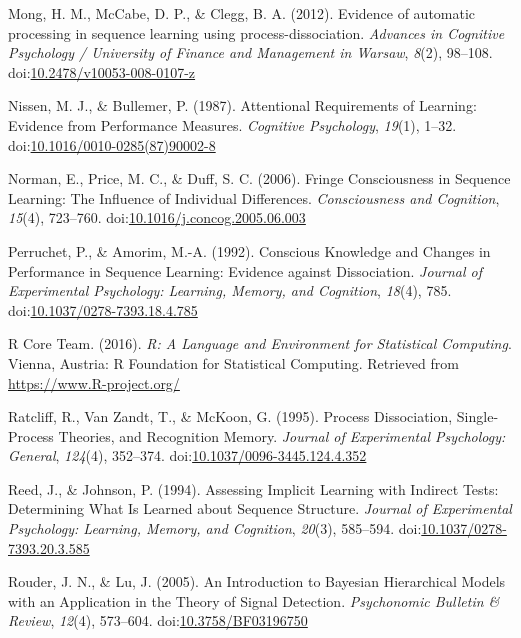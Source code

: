 \documentclass[floatsintext,man]{apa6}
\begin{document}
\hypertarget{ref-mongux5fevidenceux5f2012}{}
Mong, H. M., McCabe, D. P., \& Clegg, B. A. (2012). Evidence of
automatic processing in sequence learning using process-dissociation.
\emph{Advances in Cognitive Psychology / University of Finance and
Management in Warsaw}, \emph{8}(2), 98--108.
doi:\href{https://doi.org/10.2478/v10053-008-0107-z}{10.2478/v10053-008-0107-z}

\hypertarget{ref-nissenux5fattentionalux5f1987}{}
Nissen, M. J., \& Bullemer, P. (1987). Attentional Requirements of
Learning: Evidence from Performance Measures. \emph{Cognitive
Psychology}, \emph{19}(1), 1--32.
doi:\href{https://doi.org/10.1016/0010-0285(87)90002-8}{10.1016/0010-0285(87)90002-8}

\hypertarget{ref-normanux5ffringeux5f2006}{}
Norman, E., Price, M. C., \& Duff, S. C. (2006). Fringe Consciousness in
Sequence Learning: The Influence of Individual Differences.
\emph{Consciousness and Cognition}, \emph{15}(4), 723--760.
doi:\href{https://doi.org/10.1016/j.concog.2005.06.003}{10.1016/j.concog.2005.06.003}

\hypertarget{ref-perruchetux5fconsciousux5f1992}{}
Perruchet, P., \& Amorim, M.-A. (1992). Conscious Knowledge and Changes
in Performance in Sequence Learning: Evidence against Dissociation.
\emph{Journal of Experimental Psychology: Learning, Memory, and
Cognition}, \emph{18}(4), 785.
doi:\href{https://doi.org/10.1037/0278-7393.18.4.785}{10.1037/0278-7393.18.4.785}

\hypertarget{ref-R-base}{}
R Core Team. (2016). \emph{R: A Language and Environment for Statistical
Computing}. Vienna, Austria: R Foundation for Statistical Computing.
Retrieved from \url{https://www.R-project.org/}

\hypertarget{ref-ratcliffux5fprocessux5f1995}{}
Ratcliff, R., Van Zandt, T., \& McKoon, G. (1995). Process Dissociation,
Single-Process Theories, and Recognition Memory. \emph{Journal of
Experimental Psychology: General}, \emph{124}(4), 352--374.
doi:\href{https://doi.org/10.1037/0096-3445.124.4.352}{10.1037/0096-3445.124.4.352}

\hypertarget{ref-reedux5fassessingux5f1994}{}
Reed, J., \& Johnson, P. (1994). Assessing Implicit Learning with
Indirect Tests: Determining What Is Learned about Sequence Structure.
\emph{Journal of Experimental Psychology: Learning, Memory, and
Cognition}, \emph{20}(3), 585--594.
doi:\href{https://doi.org/10.1037/0278-7393.20.3.585}{10.1037/0278-7393.20.3.585}

\hypertarget{ref-rouderux5fintroductionux5f2005}{}
Rouder, J. N., \& Lu, J. (2005). An Introduction to Bayesian
Hierarchical Models with an Application in the Theory of Signal
Detection. \emph{Psychonomic Bulletin \& Review}, \emph{12}(4),
573--604.
doi:\href{https://doi.org/10.3758/BF03196750}{10.3758/BF03196750}
\end{document}
